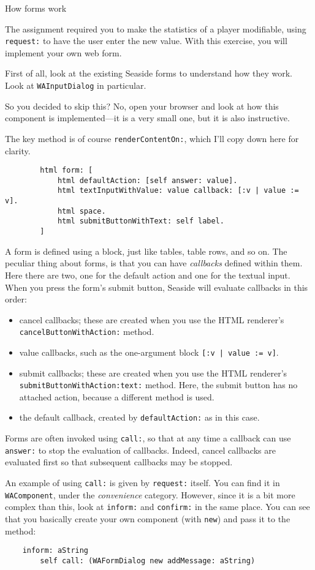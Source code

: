 \documentclass[a4paper,10pt]{scrartcl}
\begin{document}
\begin{exercise}{How forms work}

The assignment required you to make the statistics of a player modifiable,
using \texttt{request:} to have the user enter the new value.  With this
exercise, you will implement your own web form.

First of all, look at the existing Seaside forms to understand how they
work.  Look at \texttt{WAInputDialog} in particular.

So you decided to skip this?  No, open your browser and look at how this
component is implemented---it is a very small one, but it is also instructive.

The key method is of course \texttt{renderContentOn:}, which I'll copy down
here for clarity.

\begin{verbatim}
        html form: [
            html defaultAction: [self answer: value].
            html textInputWithValue: value callback: [:v | value := v].
            html space.
            html submitButtonWithText: self label.
        ]
\end{verbatim}

A form is defined using a block, just like tables, table rows, and so on.
The peculiar thing about forms, is that you can have \emph{callbacks}
defined within them.  Here there are two, one for the default action and
one for the textual input.  When you press the form's submit button, Seaside
will evaluate callbacks in this order:
\begin{itemize}
\item cancel callbacks; these are created when you use the HTML renderer's
  \texttt{cancelButtonWithAction:} method.
\item value callbacks, such as the one-argument block
  \texttt{[:v | value := v]}.
\item submit callbacks; these are created when you use the HTML renderer's
  \texttt{submitButtonWithAction:text:} method.  Here, the submit button
  has no attached action, because a different method is used.
\item the default callback, created by \texttt{defaultAction:} as in
  this case.
\end{itemize}

Forms are often invoked using \texttt{call:}, so that at any time a callback
can use \texttt{answer:} to stop the evaluation of callbacks.  Indeed, cancel
callbacks are evaluated first so that subsequent callbacks may be stopped.

An example of using \texttt{call:} is given by \texttt{request:} itself.
You can find it in \texttt{WAComponent}, under the \emph{convenience}
category.  However, since it is a bit more complex than this, look at
\texttt{inform:} and \texttt{confirm:} in the same place.  You can see
that you basically create your own component (with \texttt{new}) and
pass it to the method:

\begin{verbatim}
    inform: aString
        self call: (WAFormDialog new addMessage: aString)
\end{verbatim}

\end{exercise}
\end{document}
